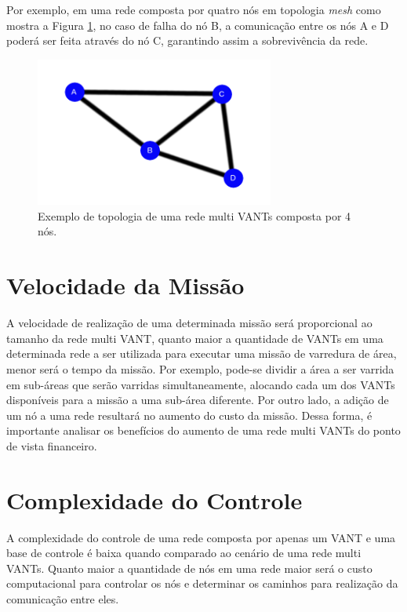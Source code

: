 Por exemplo, em uma rede composta por quatro nós em topologia \emph{mesh} como mostra a Figura \ref{fig:perdaNo}, no caso de falha do nó B, a comunicação entre os nós A e D poderá ser feita através do nó C, garantindo assim a sobrevivência da rede. 

\begin{figure} 
\center
\includegraphics[width=0.7\textwidth]{perdaNo.png}
\caption{Exemplo de topologia de uma rede multi VANTs composta por 4 nós.} 
\label{fig:perdaNo}
\end{figure} 

\section{Velocidade da Missão}

A velocidade de realização de uma determinada missão será proporcional ao tamanho da rede multi VANT, quanto maior a quantidade de VANTs em uma determinada rede a ser utilizada para executar uma missão de varredura de área, menor será o tempo da missão. Por exemplo, pode-se dividir a área a ser varrida em sub-áreas que serão varridas simultaneamente, alocando cada um dos VANTs disponíveis para a missão a uma sub-área diferente. Por outro lado, a adição de um nó a uma rede resultará no aumento do custo da missão. Dessa forma, é importante analisar os benefícios do aumento de uma rede multi VANTs do ponto de vista financeiro. 

\section{Complexidade do Controle}

A complexidade do controle de uma rede composta por apenas um VANT e uma base de controle é baixa quando comparado ao cenário de uma rede multi VANTs. Quanto maior a quantidade de nós em uma rede maior será o custo computacional para controlar os nós e determinar os caminhos para realização da comunicação entre eles.

